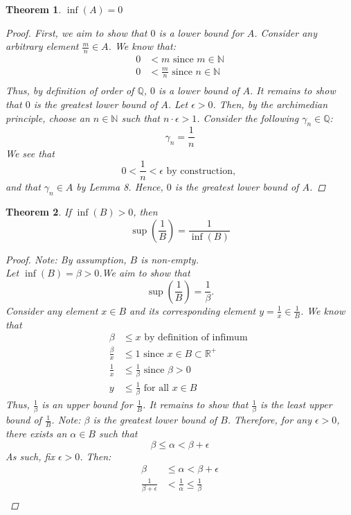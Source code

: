 \documentclass{amsart}
\newtheorem{theorem}{Theorem}
\begin{document}
\begin{enumerate}[1.]
\begin{theorem}
	$\inf(A) = 0$
	\begin{proof}
		First, we aim to show that $0$ is a lower bound for $A$. Consider any arbitrary element
		$\frac{m}{n}\in A$. We know that:
		\begin{align*}
			0 &< m \text{ since } m \in \mathbb{N}\\
			0 &< \frac{m}{n} \text{ since } n \in \mathbb{N} \\
		\end{align*}
		Thus, by definition of order of $\mathbb{Q}$, $0$ is a lower bound of $A$. It remains to show that
		$0$ is the greatest lower bound of $A$. Let $\epsilon > 0$. Then, by the archimedian principle,
		choose an $n\in\mathbb{N}$ such that $n\cdot\epsilon > 1$. Consider the following $\gamma_n \in \mathbb{Q}$:
		\[
			\gamma_n = \frac{1}{n}
		\]
		We see that 
		\[
			0 < \frac{1}{n} < \epsilon \text{ by construction, }	
		\]
		and that $\gamma_n \in A$ by Lemma 8. Hence, $0$ is the greatest lower bound of $A$.
	\end{proof}
\end{theorem}
\begin{theorem}
	If $\inf(B) > 0$, then 
	\[
		\sup\left(\frac{1}{B}\right) = \frac{1}{\inf(B)}
	\]
	\begin{proof}
		Note: By assumption, $B$ is non-empty. \\
		Let $\inf(B) = \beta > 0$.We aim to show that 
		\[
			\sup\left(\frac{1}{B}\right) = \frac{1}{\beta}.	
		\]
		Consider any element $x \in B$ and its corresponding element $y = \frac{1}{x} \in \frac{1}{B}$. We know that 
		\begin{align*}
			\beta &\leq x \text{ by definition of infimum } \\
			\frac{\beta}{x} &\leq 1 \text{ since } x \in B \subset \mathbb{R^+} \\
			\frac{1}{x} &\leq \frac{1}{\beta} \text{ since } \beta > 0 \\
			y &\leq \frac{1}{\beta} \text{ for all } x \in B
		\end{align*}
		Thus, $\frac{1}{\beta}$ is an upper bound for $\frac{1}{B}$.
		It remains to show that $\frac{1}{\beta}$ is the least upper bound of $\frac{1}{B}$.
		Note: $\beta$ is the greatest lower bound of $B$. Therefore, for any $\epsilon > 0$, there exists an
		$\alpha \in B$ such that
		\[
			\beta \leq \alpha < \beta + \epsilon	
		\]
		As such, fix $\epsilon > 0$. Then:
		\begin{align*}
			\beta &\leq \alpha < \beta + \epsilon \\
			\frac{1}{\beta + \epsilon} &< \frac{1}{\alpha} \leq \frac{1}{\beta} \\

\end{align*}
\end{proof}
\end{theorem}
\end{enumerate}
\end{document}
